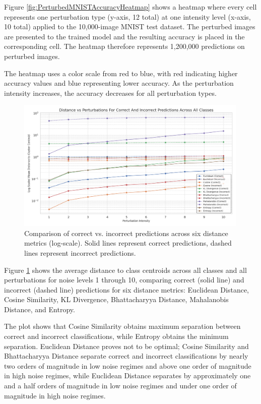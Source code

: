 Figure \ref{fig:PerturbedMNISTAccuracyHeatmap} shows a heatmap where every cell represents one perturbation type (y-axis, 12 total) at one intensity level (x-axis, 10 total) applied to the 10,000-image MNIST test dataset. The perturbed images are presented to the trained model and the resulting accuracy is placed in the corresponding cell. The heatmap therefore represents 1,200,000 predictions on perturbed images.

The heatmap uses a color scale from red to blue, with red indicating higher accuracy values and blue representing lower accuracy. As the perturbation intensity increases, the accuracy decreases for all perturbation types.

\begin{figure}[h!]
    \centering
    \includegraphics[width=0.99\textwidth]{Figures/Results/Figures_uncertainty_metrics.png}
    \caption{Comparison of correct vs. incorrect predictions across six distance metrics (log-scale). Solid lines represent correct predictions, dashed lines represent incorrect predictions.}
    \label{fig:Figures_uncertainty_metrics}
\end{figure}

Figure \ref{fig:Figures_uncertainty_metrics} shows the average distance to class centroids across all classes and all perturbations for noise levels 1 through 10, comparing correct (solid line) and incorrect (dashed line) predictions for six distance metrics: Euclidean Distance, Cosine Similarity, KL Divergence, Bhattacharyya Distance, Mahalanobis Distance, and Entropy.

The plot shows that Cosine Similarity obtains maximum separation between correct and incorrect classifications, while Entropy obtains the minimum separation. Euclidean Distance proves not to be optimal; Cosine Similarity and Bhattacharyya Distance separate correct and incorrect classifications by nearly two orders of magnitude in low noise regimes and above one order of magnitude in high noise regimes, while Euclidean Distance separates by approximately one and a half orders of magnitude in low noise regimes and under one order of magnitude in high noise regimes.

